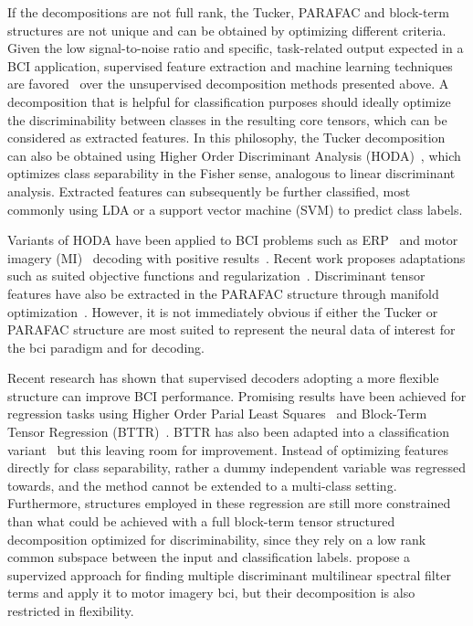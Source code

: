 If the decompositions are not full rank, the Tucker, PARAFAC and block-term
structures are not unique and can be obtained by optimizing different criteria.
Given the low signal-to-noise ratio and specific, task-related output expected
in a BCI application, supervised feature extraction and machine learning techniques are
favored~\cite{Lotte2018} over the unsupervised decomposition methods presented
above.
A decomposition that is helpful for classification purposes should ideally optimize
the discriminability between classes in the resulting core tensors, which can
be considered as extracted features.
In this philosophy, the Tucker decomposition can also be obtained
using Higher Order Discriminant Analysis
(HODA)~\cite{Yan2005,Phan2010,Froelich2018}, which optimizes class separability in the Fisher sense, analogous to linear
discriminant analysis.
Extracted features can subsequently be further classified, most commonly
using LDA or a support vector machine (SVM) to predict class labels.

Variants of HODA have been applied to BCI problems such as
ERP~\cite{Onishi2012,Higashi2016} and motor imagery (MI)~\cite{Liu2015,Cai2021}
decoding with positive results~\cite{Lotte2018}.
Recent work proposes adaptations such as suited objective
functions and regularization~\cite{Jamshidi2017,Jorajuria2022,Aghili2023}.
Discriminant tensor features have also be extracted
in the PARAFAC structure through manifold optimization~\cite{Froelich2018}.
However, it is not immediately obvious if either the Tucker or PARAFAC
structure are most suited to represent the neural data of interest for the \ac{bci}
paradigm and for decoding.

Recent research has shown that supervised decoders adopting a more flexible structure
can improve BCI performance.
Promising results have been achieved for regression tasks using
Higher Order Parial Least Squares~\cite{Camarrone2018} and Block-Term Tensor
Regression (BTTR)~\cite{Faes2022,Faes2022b}.
BTTR has also been adapted into a classification variant~\cite{Camarrone2021}
but this leaving room for improvement.
Instead of optimizing features directly for class separability, rather a dummy
independent variable was regressed towards, and the method
cannot be extended to a multi-class setting.
Furthermore, structures employed in these regression are still more constrained
than what could be achieved with a full block-term tensor structured decomposition
optimized for discriminability, since they rely on a low rank common subspace
between the input and classification labels.
\textcite{Huang2020} propose a supervized approach for finding multiple discriminant
multilinear spectral filter terms and apply it to motor imagery \ac{bci}, but their
decomposition is also restricted in flexibility.


